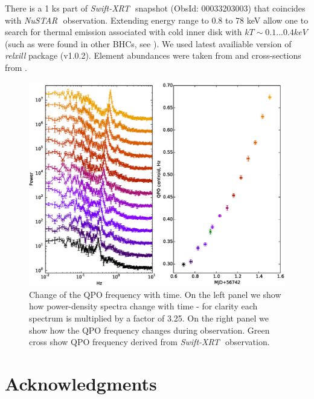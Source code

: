 \documentclass[a4paper,fleqn,usenatbib]{mnras}
\def\swiftx{{\em Swift-XRT\,}}
\def\nustar{{\em NuSTAR\,}}
\begin{document}
There is a 1 ks part of \swiftx\, snapshot (ObsId: 00033203003) that coincides with \nustar\, observation.  Extending energy range to 0.8 to 78 keV allow one to search for thermal emission associated with cold inner disk with $kT \sim 0.1...0.4 keV$ (such as were found in other BHCs, see \cite[][ e.t.c]{miller06b,miller06a,parker15}).
We used latest availiable version of {\it relxill} package (v1.0.2). 
Element abundances were taken from \cite{wilms00} and cross-sections from \cite{verner96}.

\begin{figure}
\centerline{\includegraphics[scale=0.7]{QPOdrift_v02.eps}}
\caption{Change of the QPO frequency with time. On the left panel we show how power-density spectra change with time - for clarity each spectrum is multiplied by a factor of 3.25. On the right panel we show how the QPO frequency changes during observation. Green cross show QPO frequency derived from \swiftx\, observation.} 
\label{fig:qpodrift}
\end{figure}  




\section*{Acknowledgments}



\bsp	
\label{lastpage}
\end{document}
